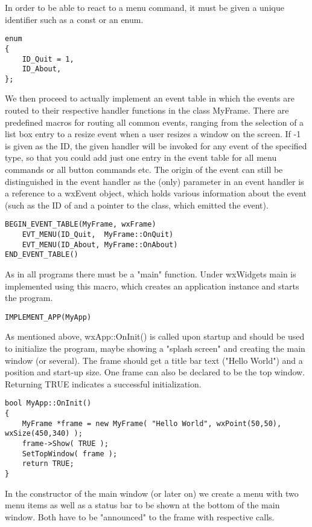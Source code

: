 In order to be able to react to a menu command, it must be given a unique
identifier such as a const or an enum.

\begin{verbatim}
enum
{
    ID_Quit = 1,
    ID_About,
};
\end{verbatim}

We then proceed to actually implement an event table in which the events
are routed to their respective handler functions in the class MyFrame.
There are predefined macros for routing all common events, ranging from
the selection of a list box entry to a resize event when a user resizes
a window on the screen. If -1 is given as the ID, the given handler will be
invoked for any event of the specified type, so that you could add just
one entry in the event table for all menu commands or all button commands etc.
The origin of the event can still be distinguished in the event handler as
the (only) parameter in an event handler is a reference to a wxEvent object,
which holds various information about the event (such as the ID of and a
pointer to the class, which emitted the event).

\begin{verbatim}
BEGIN_EVENT_TABLE(MyFrame, wxFrame)
    EVT_MENU(ID_Quit,  MyFrame::OnQuit)
    EVT_MENU(ID_About, MyFrame::OnAbout)
END_EVENT_TABLE()
\end{verbatim}

As in all programs there must be a "main" function. Under wxWidgets main is implemented
using this macro, which creates an application instance and starts the program.

\begin{verbatim}
IMPLEMENT_APP(MyApp)
\end{verbatim}

As mentioned above, wxApp::OnInit() is called upon startup and should be
used to initialize the program, maybe showing a "splash screen" and creating
the main window (or several). The frame should get a title bar text ("Hello World")
and a position and start-up size. One frame can also be declared to be the
top window. Returning TRUE indicates a successful initialization.

\begin{verbatim}
bool MyApp::OnInit()
{
    MyFrame *frame = new MyFrame( "Hello World", wxPoint(50,50), wxSize(450,340) );
    frame->Show( TRUE );
    SetTopWindow( frame );
    return TRUE;
}
\end{verbatim}

In the constructor of the main window (or later on) we create a menu with two menu 
items as well as a status bar to be shown at the bottom of the main window. Both have 
to be "announced" to the frame with respective calls.

